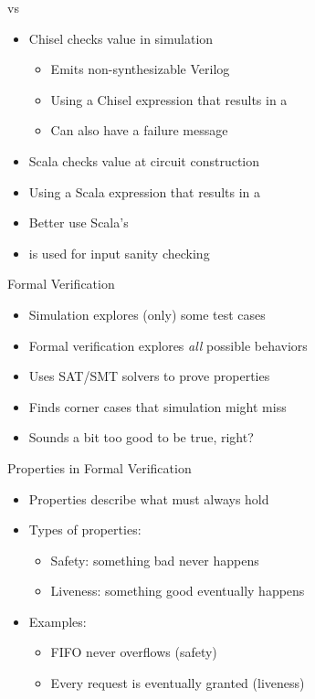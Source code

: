 \begin{frame}[fragile]{ vs }
\begin{itemize}
\item Chisel  checks value in simulation
\begin{itemize}
\item Emits non-synthesizable Verilog
\item Using a Chisel expression that results in a 
\item Can also have a failure message
\end{itemize}
\item Scala  checks value at circuit construction
\item Using a Scala expression that results in a 
\item Better use Scala's 
\item {} is used for input sanity checking
\end{itemize}
\end{frame}


\begin{frame}[fragile]{Formal Verification}
\begin{itemize}
\item Simulation explores (only) some test cases
\item Formal verification explores \emph{all} possible behaviors
\item Uses SAT/SMT solvers to prove properties
\item Finds corner cases that simulation might miss
\item Sounds a bit too good to be true, right?
\end{itemize}
\end{frame}

\begin{frame}{Properties in Formal Verification}
\begin{itemize}
    \item Properties describe what must always hold
    \item Types of properties:
    \begin{itemize}
        \item Safety: something bad never happens
        \item Liveness: something good eventually happens
    \end{itemize}
    \item Examples:
    \begin{itemize}
        \item FIFO never overflows (safety)
        \item Every request is eventually granted (liveness)
    \end{itemize}
\end{itemize}
\end{frame}


